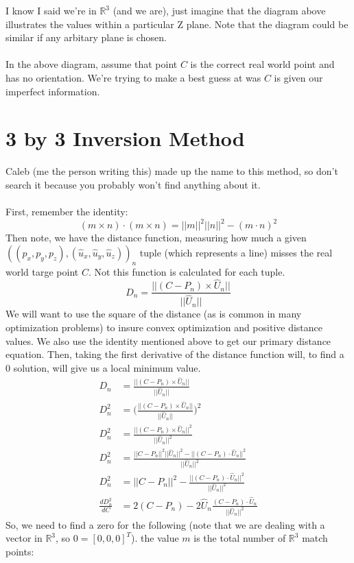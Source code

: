 I know I said we're in $\mathbb{R}^{3}$ (and we are), just imagine that the diagram
above illustrates the values within a particular Z plane. Note that the diagram
could be similar if any arbitary plane is chosen.\\
\\
In the above diagram, assume that point $C$ is the correct real world point and
has no orientation. We're trying to make a best guess at was $C$ is given our
imperfect information.

\section{3 by 3 Inversion Method}
Caleb (me the person writing this) made up the name to this method, so don't
search it because you probably won't find anything about it. \\
\\
First, remember the identity:
\[
(m \times n) \cdot (m \times n) = || m ||^2  || n ||^2 - (m \cdot n)^2
\]
Then note, we have the distance function, measuring how much a given
$((p_x, p_y, p_z), (\hat{u}_x, \hat{u}_y, \hat{u}_z))_n$ tuple (which represents
a line) misses the real world targe point $C$. Not this function is calculated
for each tuple.
\[
D_n = \frac{||(C - P_n) \times \hat{U}_n || }{ || \hat{U}_n ||}
\]
We will want to use the square of the distance (as is common in many optimization
problems) to insure convex optimization and positive distance values. We also use
the identity mentioned above to get our primary distance equation. Then, taking
the first derivative of the distance function will, to find a $0$ solution, will
give us a local minimum value.
\begin{align*}
    D_n &= \frac{||(C - P_n) \times \hat{U}_n || }{ || \hat{U}_n ||} \\
    D_n^2 &= \Big( \frac{||(C - P_n) \times \hat{U}_n || }{ || \hat{U}_n ||} \Big)^2 \\
    D_n^2 &= \frac{||(C - P_n) \times \hat{U}_n ||^2  }{ || \hat{U}_n ||^2 }\\
    D_n^2 &= \frac{ || C - P_n ||^2   || \hat{U}_n ||^2 - ||(C - P_n) \cdot \hat{U}_n ||^2 }{ || \hat{U}_n ||^2 }\\
    D_n^2 &= || C - P_n ||^2  - \frac{ ||(C - P_n) \cdot \hat{U}_n ||^2 }{|| \hat{U}_n ||^2} \\
    \frac{d D_n^2}{d C} &= 2 (C - P_n) - 2 \hat{U}_n  \frac{ (C - P_n) \cdot \hat{U}_n }{ || \hat{U}_n ||^2 }
\end{align*}
So, we need to find a zero for the following (note that we are dealing with a
vector in $\mathbb{R}^{3}$, so $0 = [0 , 0, 0]^T$). the value $m$ is the total number
of $\mathbb{R}^{3}$ match points:

